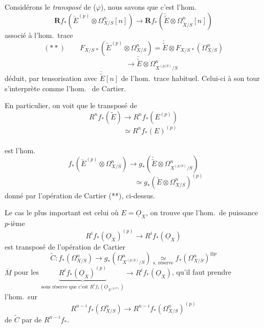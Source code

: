\documentclass[11pt,a4paper]{article}
\begin{document}

Considérons le \emph{transposé} de ($\varphi$), nous savons que c'est l'hom.
\[
\mathbf{R}f_{*}(\check{E}^{(p)} \otimes \Omega^{n}_{X/S}[n]) \to \mathbf{R}f_{*}(\check{\widetilde{E}} \otimes \Omega^{n}_{\widetilde{X}/S}[n])
\]
associé à l'hom.\ trace
\[
(**) \qquad F_{X/S\,*}(\check{E}^{(p)} \otimes \Omega^{n}_{X/S}) = \check{\widetilde{E}} \otimes F_{X/S\,*}(\Omega^{n}_{X/S})
\]
\[
\phantom{(**) \qquad} \to \check{\widetilde{E}} \otimes \Omega^{n}_{X^{(p/S)}/S}
\]
déduit, par tensorisation avec $\check{\widetilde{E}}[n]$ \struck{\ill{}} de l'hom.\ trace habituel.
 Celui-ci à son tour s'interprète comme l'hom.\  de Cartier.

En particulier, on voit que le transposé de
\[
R^{n}f_{*}(\widetilde{E}) \longrightarrow R^{n}f_{*}(E^{(p)})
\]
\[
\phantom{R^{n}f_{*}(\widetilde{E})} \simeq R^{n}f_{*}(E)^{(p)}
\]

est l'hom.
\[
f_{*}(\check{E}^{(p)} \otimes \Omega^{n}_{X/S}) \to g_{*}(\check{\widetilde{E}} \otimes \Omega^{n}_{X^{(p/S)}/S})
\]
\[
\phantom{f_{*}(\check{E}^{(p)} \otimes \Omega^{n}_{X/S}) \to{}} \simeq g_{*}(\check{E} \otimes \Omega^{n}_{X/S})^{(p)}
\]
donné par l'opération de Cartier (**), ci-dessus.

Le cas le plus important est celui où $E = \underline{O}_{X}$, on trouve que l'hom.\ de puissance $p$-ième
\[
R^{i}f_{*}(\underline{O}_{X})^{(p)} \to R^{i}f_{*}(\underline{O}_{X})
\]
est transposé de l'opération de Cartier
\[
\widetilde{C} : f_{*}(\Omega^{n}_{X/S}) \to g_{*}(\Omega^{n}_{X^{(p/S)}/S}) \underset{\text{s.\ réserve}}{\simeq} f_{*}(\Omega^{n}_{X/S})^{\otimes p}
\]
$\overline{M}$  pour les $\underbrace{R^{i}f_{*}(\underline{O}_{X})^{(p)}}_{\text{sous réserve que c'est } R^{i}f_{*}(\underline{O}_{X^{(p/S)}})} \to R^{i}f_{*}(\underline{O}_{X})$,    qu'il faut prendre l'hom.\ sur
\[
R^{n-i}f_{*}(\Omega^{n}_{X/S}) \to R^{n-i}f_{*}(\Omega^{n}_{X/S})^{(p)}
\]
 de $\widetilde{C}$ par  de $R^{n-i}f_{*}$.
\end{document}
